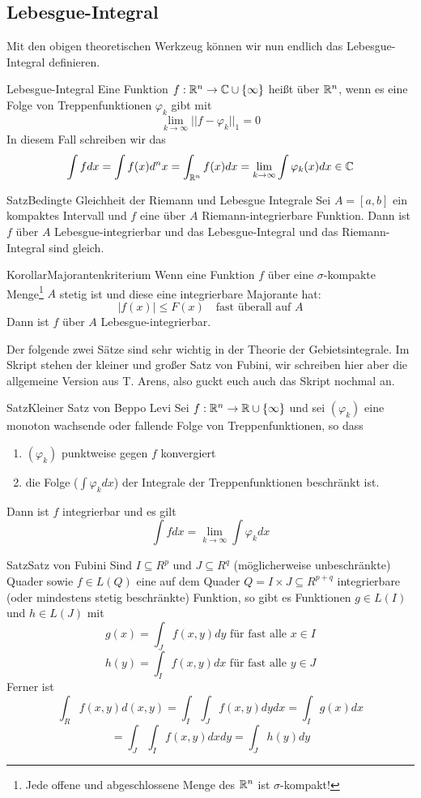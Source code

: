 \subsection{Lebesgue-Integral}
Mit den obigen theoretischen Werkzeug können wir nun endlich das Lebesgue-Integral definieren.
\begin{Def}{Lebesgue-Integral}
Eine Funktion $f:\mathbb{R}^n\rightarrow\mathbb{C}\cup\{\infty\}$ heißt  über $\mathbb{R}^n$, wenn es eine Folge von Treppenfunktionen $\varphi_k$ gibt mit
$$\lim_{k\rightarrow \infty}||f-\varphi_k||_1=0$$
In diesem Fall schreiben wir das 
$$\int fdx = \int f(x) d^nx = \int_{\mathbb{R}^n} f(x)dx = \lim_{k\rightarrow\infty}\int \varphi_k(x)dx\in\mathbb{C}$$
\end{Def}
\begin{Satz}{Satz}{Bedingte Gleichheit der Riemann und Lebesgue Integrale}
Sei $A=[a,b]$ ein kompaktes Intervall und $f$ eine über $A$ Riemann-integrierbare Funktion. Dann ist $f$ über $A$ Lebesgue-integrierbar und das Lebesgue-Integral und das Riemann-Integral sind gleich.
\end{Satz}
\begin{Satz}{Korollar}{Majorantenkriterium}
    Wenn eine Funktion $f$ über eine $\sigma$-kompakte Menge\footnote{Jede offene und abgeschlossene Menge des $\mathbb{R}^n$ ist $\sigma$-kompakt!} $A$ stetig ist und diese eine integrierbare Majorante hat:
    $$|f(x)|\leq F(x) \quad \mbox{fast überall auf }A$$
    Dann ist $f$ über $A$ Lebesgue-integrierbar.
\end{Satz}
Der folgende zwei Sätze sind sehr wichtig in der Theorie der Gebietsintegrale. Im Skript stehen der kleiner und großer Satz von Fubini, wir schreiben hier aber die allgemeine Version aus T. Arens, also guckt euch auch das Skript nochmal an.
\begin{Satz}{Satz}{Kleiner Satz von Beppo Levi}
Sei $f:\mathbb{R}^n\rightarrow \mathbb{R}\cup \{\infty\}$ und sei $(\varphi_k)$ eine monoton wachsende oder fallende Folge von Treppenfunktionen, so dass
\begin{enumerate}
    \item $(\varphi_k)$ punktweise gegen $f$ konvergiert
    \item die Folge ($\int \varphi_k dx$) der Integrale der Treppenfunktionen beschränkt ist.

\end{enumerate}
    Dann ist $f$ integrierbar und es gilt
    $$\int f dx=\lim_{k\rightarrow \infty}\int \varphi_k dx$$
\end{Satz}
\begin{Satz}{Satz}{Satz von Fubini}
Sind $I\subseteq R^p$ und $J\subseteq R^q$ (möglicherweise unbeschränkte) Quader sowie $f\in L(Q)$ eine auf dem Quader $Q=I\times J \subseteq R^{p+q}$ integrierbare (oder mindestens stetig beschränkte) Funktion, so gibt es Funktionen $g\in L(I)$ und $h\in L(J)$ mit
$$g(x)=\int_J f(x,y) dy \mbox{ für fast alle $x\in I$}$$
$$h(y)=\int_I f(x,y)dx \mbox{ für fast alle $y\in J$}$$
Ferner ist 
$$\int_R f(x,y) d(x,y) = \int_I\int_J f(x,y) dy dx = \int_I g(x) dx$$
$$=\int_J\int_I f(x,y) dx dy = \int_J h(y) dy$$

\end{Satz}

